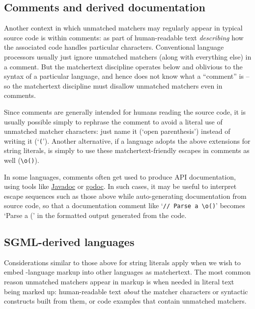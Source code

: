 

\subsection{Comments and derived documentation}

Another context in which unmatched matchers may regularly appear
in typical source code is within comments:
\eg as part of human-readable text \emph{describing}
how the associated code handles particular characters.
Conventional language processors usually just ignore unmatched matchers
(along with everything else) in a comment.
But the matchertext discipline operates below and oblivious to
the syntax of a particular language,
and hence does not know what a ``comment'' is --
so the matchertext discipline must disallow unmatched matchers even in comments.

Since comments are generally intended for humans reading the source code,
it is usually possible simply to rephrase the comment
to avoid a literal use of unmatched matcher characters:
\eg just name it (`open parenthesis')
instead of writing it (`\verb|(|').
Another alternative,
if a language adopts the above extensions for string literals,
is simply to use these matchertext-friendly escapes in comments as well
(\eg \verb|\o()|).

In some languages,
comments often get used to produce API documentation,
using tools like \href{https://www.oracle.com/java/technologies/javase/javadoc-tool.html}{Javadoc}
or \href{https://pkg.go.dev/golang.org/x/tools/cmd/godoc}{godoc}.
In such cases,
it may be useful to interpret escape sequences such as those above
while auto-generating documentation from source code,
so that a documentation comment like `\verb|// Parse a \o()|'
becomes `Parse a (' in the formatted output generated from the code.


\subsection{SGML-derived languages}
\label{sec:embed:ml}

Considerations similar to those above for string literals
apply when we wish to embed \ml-language markup
into other languages as matchertext.
The most common reason unmatched matchers appear in markup
is when needed in literal text being marked up:
\eg human-readable text \emph{about} the matcher characters
or syntactic constructs built from them,
or code examples that contain unmatched matchers.

